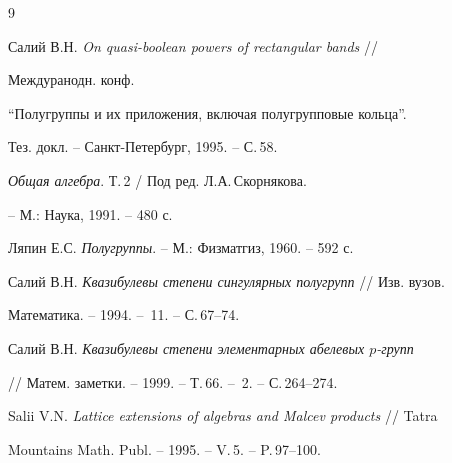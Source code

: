 \begin{thebibliography}{9}







Салий В.Н. {\em On quasi-boolean powers of rectangular bands} //


Междуранодн. конф.


``Полугруппы и их приложения, включая полугрупповые кольца''.


Тез. докл. -- Санкт-Петербург, 1995. -- С.\,58.




{\em Общая алгебра}. Т.\,2 / Под ред. Л.А.\,Скорнякова.


-- М.: Наука, 1991. -- 480 с.




Ляпин Е.С. {\em Полугруппы}. -- М.: Физматгиз, 1960. -- 592 с.




Салий В.Н. {\em Квазибулевы степени сингулярных полугрупп} // Изв. вузов.


Математика. -- 1994. -- \No\,11. -- С.\,67--74.




Салий В.Н. {\em Квазибулевы степени элементарных абелевых $p$-групп}


// Матем. заметки. -- 1999. -- Т.\,66. -- \No\,2. -- С.\,264--274.




Salii V.N. {\em Lattice extensions of algebras and Malcev products} // Tatra


Mountains Math. Publ. -- 1995. -- V.\,5. -- P.\,97--100.








\end{thebibliography}





\vskip 2cm












\label{end}





